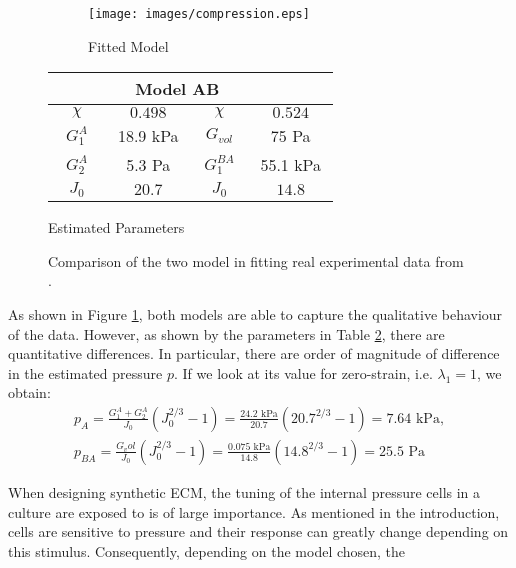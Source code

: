 \begin{figure}
	\hspace{-8mm}
	\begin{subfigure}{0.62\textwidth}
		\hspace{6mm}
		\texttt{[image: images/compression.eps]}
		\caption{Fitted Model}
		\label{fit}
	\end{subfigure}
	\begin{subtable}{0.375\textwidth}
			\begin{tabular}{c | c ||c| c }		
				\hline\addlinespace[2pt]
				 \multicolumn{2}{c||}{Model A} &  \multicolumn{2}{c}{Model AB}\\[0.5mm]
				\hline\addlinespace[2pt]
				$\quad \chi\quad$ & $\quad0.498\quad$ &$\quad \chi\quad$&$\quad0.524\quad$\\[0.5mm]
				$G^A_1$ & 18.9 kPa&$G_{vol}$&75 Pa\\[0.5mm]
				$G^A_2$ & 5.3 Pa&$G^{BA}_{1}$& 55.1 kPa\\[0.5mm]
				$J_0$ & $20.7$&  $J_0$&$14.8$\\[0.5mm]
				\hline
			\end{tabular}
		\caption{Estimated Parameters}
		\label{param}
	\end{subtable}
\caption{Comparison of the two model in fitting real experimental data from \cite{Netti}.}		
\end{figure}

As shown in Figure \ref{fit}, both models are able to capture the qualitative behaviour of the data. However, as shown by the parameters in Table \ref{param}, there are quantitative differences. In particular, there are order of magnitude of difference in the estimated pressure $p$. If we look at its value for zero-strain, i.e. $\lambda_1=1$, we obtain: 
\begin{gather}
p_A = \frac{G^A_1+G^A_2}{J_0}(J_0^{2/3}-1) = \frac{24.2 \text{ kPa}}{20.7}(20.7^{2/3}-1) = 7.64 \text{ kPa},\\
p_{BA} = \frac{G_vol}{J_0}(J_0^{2/3}-1) = \frac{0.075 \text{ kPa}}{14.8}(14.8^{2/3}-1) = 25.5 \text{ Pa}
\end{gather}

When designing synthetic ECM, the tuning of the internal pressure cells in a culture are exposed to is of large importance. As mentioned in the introduction, cells are sensitive to pressure and their response can greatly change depending on this stimulus. Consequently, depending on the model chosen, the
